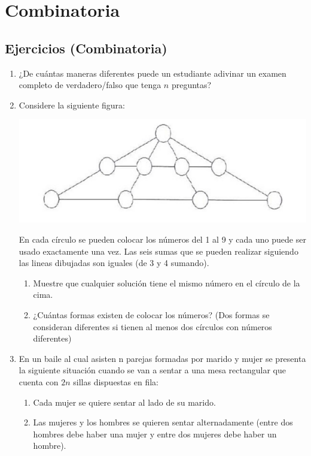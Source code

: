 \documentclass{book}
\begin{document}
	\chapter{Combinatoria}
	
		\section{Ejercicios (Combinatoria)}
		\begin{enumerate}
				\item ¿De cuántas maneras diferentes puede un estudiante adivinar un examen completo de verdadero/falso que tenga $n$ preguntas?
				\item Considere la siguiente figura: 
					\begin{center}
						\includegraphics[scale=1]{imagenes/Combinatoria/1,1.png}
					\end{center}
					En cada círculo se pueden colocar los números del 1 al 9 y cada uno puede ser usado exactamente una vez. Las seis sumas que se pueden realizar siguiendo las lineas dibujadas son iguales (de 3 y 4 sumando). 
					\begin{enumerate}
						 \item Muestre que cualquier solución tiene el mismo número en el círculo de la cima.
						 \item ¿Cuántas formas existen de colocar los números? (Dos formas se consideran diferentes si tienen al menos dos círculos con números diferentes)
					\end{enumerate}					 
				\item En un baile al cual asisten n parejas formadas por marido y mujer se presenta la siguiente situación cuando se van a sentar a una mesa rectangular que cuenta con $2n$ sillas dispuestas en fila:
					\begin{enumerate}
						\item Cada mujer se quiere sentar al lado de su marido.
						\item Las mujeres y los hombres se quieren sentar alternadamente (entre dos hombres debe haber una mujer y entre dos mujeres debe haber un hombre).

\end{enumerate}
\end{enumerate}
\end{document}
